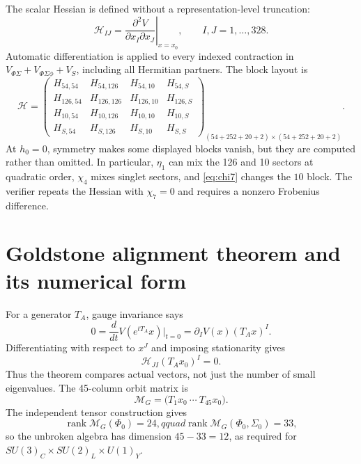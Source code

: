 \documentclass[11pt]{article}
\newcommand{\cH}{\mathcal H}
\newcommand{\cM}{\mathcal M}
\begin{document}
The scalar Hessian is defined without a representation-level truncation:
\begin{equation}
 \boxed{\cH_{IJ}=\left.\frac{\partial^2V}{\partial x_I\partial x_J}
 \right|_{x=x_0},\qquad I,J=1,\ldots,328.}
 \label{eq:fullH}
\end{equation}
Automatic differentiation is applied to every indexed contraction in
$V_{\Phi\Sigma}+V_{\Phi\Sigma\phi}+V_S$, including all Hermitian partners.
The block layout is
\begin{equation}
\cH=\begin{pmatrix}
H_{54,54}&H_{54,126}&H_{54,10}&H_{54,S}\\
H_{126,54}&H_{126,126}&H_{126,10}&H_{126,S}\\
H_{10,54}&H_{10,126}&H_{10,10}&H_{10,S}\\
H_{S,54}&H_{S,126}&H_{S,10}&H_{S,S}
\end{pmatrix}_{(54+252+20+2)\times(54+252+20+2)}.
\end{equation}
At $h_0=0$, symmetry makes some displayed blocks vanish, but they are
computed rather than omitted.  In particular, $\eta_1$ can mix the 126 and
10 sectors at quadratic order, $\chi_4$ mixes singlet sectors, and
\eqref{eq:chi7} changes the $10$ block.  The verifier repeats the Hessian with
$\chi_7=0$ and requires a nonzero Frobenius difference.

\section{Goldstone alignment theorem and its numerical form}

For a generator $T_A$, gauge invariance says
\begin{equation}
0=\frac{d}{dt}V(e^{tT_A}x)\big|_{t=0}
=\partial_IV(x)(T_Ax)^I.
\end{equation}
Differentiating with respect to $x^J$ and imposing stationarity gives
\begin{equation}
 \cH_{JI}(T_Ax_0)^I=0.
 \label{eq:goldstoneproof}
\end{equation}
Thus the theorem compares actual vectors, not just the number of small
eigenvalues.  The 45-column orbit matrix is
\begin{equation}
 \cM_G=\bigl(T_1x_0\ \cdots\ T_{45}x_0\bigr).
\end{equation}
The independent tensor construction gives
\begin{equation}
 \operatorname{rank}\cM_G(\Phi_0)=24,qquad
 \operatorname{rank}\cM_G(\Phi_0,\Sigma_0)=33,
\end{equation}
so the unbroken algebra has dimension $45-33=12$, as required for
$SU(3)_C\times SU(2)_L\times U(1)_Y$.
\end{document}
